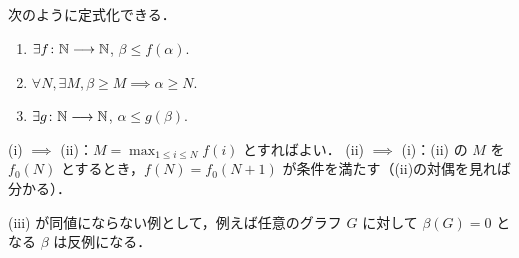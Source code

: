\subsection{}
次のように定式化できる．
\begin{enumerate}
 \item $\exists f\colon \mathbb{N}\longrightarrow \mathbb{N}$, $\beta \leq f(\alpha)$. 
 \item $\forall N, \exists M, \beta\geq M \implies \alpha\geq N$. 
 \item $\exists g\colon \mathbb{N}\longrightarrow \mathbb{N}$, $\alpha\leq g(\beta)$. 
\end{enumerate}

(i) $\implies$ (ii)：$M = \max_{1\leq i\leq N} f(i)$ とすればよい．
(ii) $\implies$ (i)：(ii) の $M$ を $f_0(N)$ とするとき，$f(N) = f_0(N+1)$ が条件を満たす（(ii)の対偶を見れば分かる）．

(iii) が同値にならない例として，例えば任意のグラフ $G$ に対して $\beta(G) = 0$ となる $\beta$ は反例になる．
